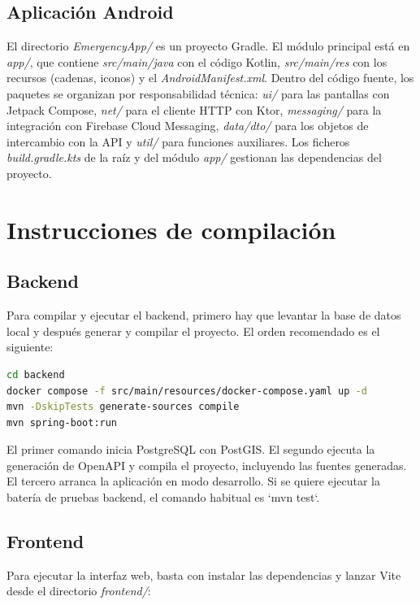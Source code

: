 \subsection{Aplicación Android}

El directorio \textit{EmergencyApp/} es un proyecto Gradle. El módulo principal está en \textit{app/}, que contiene \textit{src/main/java} con el código Kotlin, \textit{src/main/res} con los recursos (cadenas, iconos) y el \textit{AndroidManifest.xml}. Dentro del código fuente, los paquetes se organizan por responsabilidad técnica: \textit{ui/} para las pantallas con Jetpack Compose, \textit{net/} para el cliente HTTP con Ktor, \textit{messaging/} para la integración con Firebase Cloud Messaging, \textit{data/dto/} para los objetos de intercambio con la API y \textit{util/} para funciones auxiliares. Los ficheros \textit{build.gradle.kts} de la raíz y del módulo \textit{app/} gestionan las dependencias del proyecto.

\section{Instrucciones de compilación}

\subsection{Backend}

Para compilar y ejecutar el backend, primero hay que levantar la base de datos local y después generar y compilar el proyecto. El orden recomendado es el siguiente:

\begin{lstlisting}[language=Bash]
cd backend
docker compose -f src/main/resources/docker-compose.yaml up -d
mvn -DskipTests generate-sources compile
mvn spring-boot:run
\end{lstlisting}

El primer comando inicia PostgreSQL con PostGIS. El segundo ejecuta la generación de OpenAPI y compila el proyecto, incluyendo las fuentes generadas. El tercero arranca la aplicación en modo desarrollo. Si se quiere ejecutar la batería de pruebas backend, el comando habitual es `mvn test`.

\subsection{Frontend}

Para ejecutar la interfaz web, basta con instalar las dependencias y lanzar Vite desde el directorio \textit{frontend/}:


